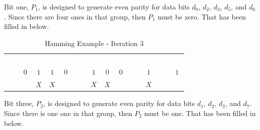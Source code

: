Bit one, $ P_1 $, is designed to generate even parity for data bits $ d_0 $, $ d_2 $, $ d_3 $, $ d_5 $, and $ d_6 $. Since there are four ones in that group, then $ P_1 $ must be zero. That has been filled in below. 

\begin{table}[H]
  \sffamily
  \newcommand{\head}[1]{\textcolor{white}{\textbf{#1}}}		
  \begin{center}
    \begin{tabular}{ccccccccccccc} 
      \rowcolor{black!75}
      \head{$ P_4 $} & \head{$ d_7 $} & \head{$ d_6 $} &
      \head{$ d_5 $} & \head{$ d_4 $} & \head{$ P_3 $} &
      \head{$ d_3 $} & \head{$ d_2 $} & \head{$ d_1 $} &
      \head{$ P_2 $} & \head{$ d_0 $} & \head{$ P_1 $} &
      \head{$ P_0 $} \\
      \color{gray}{$ 0 $} & $ 0 $ & $ 1 $ &
      $ 1 $ & $ 0 $ & \color{gray}{$ 0 $} &
      $ 1 $ & $ 0 $ & $ 0 $ &
      \color{gray}{$ 0 $} & $ 1 $ & \color{red}{$ 0 $} &
      $ 1 $ \\
      \color{gray}{$ 0 $} & \color{gray}{$ 0 $} & $ X $ &
      $ X $ & \color{gray}{$ 0 $} & \color{gray}{$ 0 $} &
      $ X $ & $ X $ & \color{gray}{$ 0 $} &
      \color{gray}{$ 0 $} & $ X $ & \color{red}{$ P $} &
      \color{gray}{$ 0 $} \\
    \end{tabular}
  \end{center}
  \caption{Hamming Example - Iteration 3}
  \label{cl:tab:hamming_example_iteration_3}
\end{table}

Bit three, $ P_2 $, is designed to generate even parity for data bits $ d_1 $, $ d_2 $, $ d_3 $, and $ d_7 $. Since there is one one in that group, then $ P_2 $ must be one. That has been filled in below. 

